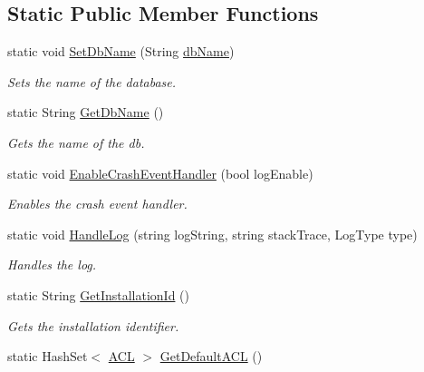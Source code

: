 \subsection*{Static Public Member Functions}
\begin{DoxyCompactItemize}
\item 
static void \hyperlink{classcom_1_1shephertz_1_1app42_1_1paas_1_1sdk_1_1csharp_1_1_app42_a_p_i_a916b2d39a495a612b5d136c867fc93a7}{Set\+Db\+Name} (String \hyperlink{classcom_1_1shephertz_1_1app42_1_1paas_1_1sdk_1_1csharp_1_1_app42_a_p_i_afd376bb446a8f89b77f9afbd55c6fac9}{db\+Name})
\begin{DoxyCompactList}\small\item\em Sets the name of the database. \end{DoxyCompactList}\item 
static String \hyperlink{classcom_1_1shephertz_1_1app42_1_1paas_1_1sdk_1_1csharp_1_1_app42_a_p_i_a9789cdfc4a0bf6ce6b9ee9d14a86a6b5}{Get\+Db\+Name} ()
\begin{DoxyCompactList}\small\item\em Gets the name of the db. \end{DoxyCompactList}\item 
static void \hyperlink{classcom_1_1shephertz_1_1app42_1_1paas_1_1sdk_1_1csharp_1_1_app42_a_p_i_a010a8e5acc9b8742754cd717c4292547}{Enable\+Crash\+Event\+Handler} (bool log\+Enable)
\begin{DoxyCompactList}\small\item\em Enables the crash event handler. \end{DoxyCompactList}\item 
static void \hyperlink{classcom_1_1shephertz_1_1app42_1_1paas_1_1sdk_1_1csharp_1_1_app42_a_p_i_ac5ac618f1916a1299539c7e3172c7ffe}{Handle\+Log} (string log\+String, string stack\+Trace, Log\+Type type)
\begin{DoxyCompactList}\small\item\em Handles the log. \end{DoxyCompactList}\item 
static String \hyperlink{classcom_1_1shephertz_1_1app42_1_1paas_1_1sdk_1_1csharp_1_1_app42_a_p_i_a27892be768f78fd3723a02f2332a801f}{Get\+Installation\+Id} ()
\begin{DoxyCompactList}\small\item\em Gets the installation identifier. \end{DoxyCompactList}\item 
static Hash\+Set$<$ \hyperlink{classcom_1_1shephertz_1_1app42_1_1paas_1_1sdk_1_1csharp_1_1_a_c_l}{A\+C\+L} $>$ \hyperlink{classcom_1_1shephertz_1_1app42_1_1paas_1_1sdk_1_1csharp_1_1_app42_a_p_i_a1c88f4830eac93006c00d566fc49d2f5}{Get\+Default\+A\+C\+L} ()

\end{DoxyCompactItemize}
